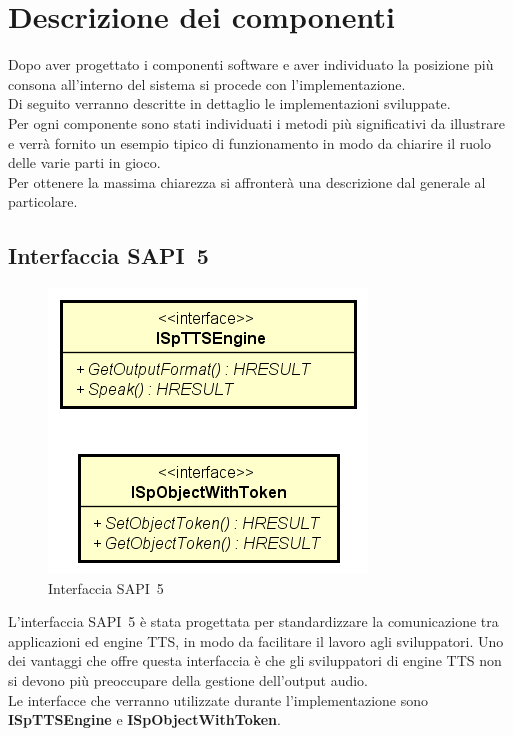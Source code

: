 \chapter{Descrizione dei componenti}
\label{chap:descrizione-dei-componenti}
Dopo aver progettato i componenti software e aver individuato la posizione più consona all'interno del sistema si procede con l'implementazione.\\
Di seguito verranno descritte in dettaglio le implementazioni sviluppate.\\
Per ogni componente sono stati individuati i metodi più significativi da illustrare e verrà fornito un esempio tipico di funzionamento in modo da chiarire il ruolo delle varie parti in gioco.\\
Per ottenere la massima chiarezza si affronterà una descrizione dal generale al particolare. 
 
\thispagestyle{empty}

\newpage
\section{Interfaccia SAPI~5}
\begin{figure}[H]
	\centering
	\includegraphics{images/sapi5-interface.png}
	\caption{Interfaccia SAPI~5}
\end{figure}

L'interfaccia SAPI~5 è stata progettata per standardizzare la comunicazione tra applicazioni ed engine TTS, in modo da facilitare il lavoro agli sviluppatori. Uno dei vantaggi che offre questa interfaccia è che gli sviluppatori di engine TTS non si devono più preoccupare della gestione dell'output audio.\\
Le interfacce che verranno utilizzate durante l'implementazione sono \textbf{ISpTTSEngine} e \textbf{ISpObjectWithToken}.
